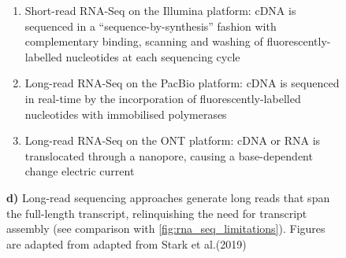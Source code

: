 \begin{figure}[htp]
{\begin{enumerate}[label=\textbf{\alph*)}]
			\item Short-read RNA-Seq on the Illumina platform: cDNA is sequenced in a “sequence-by-synthesis” fashion with complementary binding, scanning and washing of fluorescently-labelled nucleotides at each sequencing cycle
			\item Long-read RNA-Seq on the PacBio platform: cDNA is sequenced in real-time by the incorporation of fluorescently-labelled nucleotides with immobilised polymerases
			\item Long-read RNA-Seq on the ONT platform: cDNA or RNA is translocated through a nanopore, causing a base-dependent change electric current
			\\
		\end{enumerate}
		\textbf{d)} Long-read sequencing approaches generate long reads that span the full-length transcript, relinquishing the need for transcript assembly (see comparison with \cref{fig:rna_seq_limitations}). \newline
		Figures are adapted from adapted from Stark et al.(2019) \cite{Stark2019}
	} 
	\label{fig:longread_benefits}
\end{figure}	

